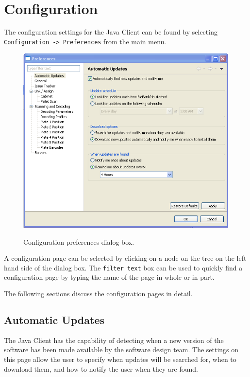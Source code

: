 \chapter{Configuration}
The configuration settings for the Java Client can be found by selecting
\texttt{Configuration -> Preferences} from the main menu.
    \begin{figure}[H]
      \centering
      \scalebox{0.5}
      { \includegraphics*{screenshots/configuration/preferences_dialog} }
      \caption{Configuration preferences dialog box.}
      \label{fig:preferences_dialog}
    \end{figure}
A configuration page can be selected by clicking on a node on the
tree on the left hand side of the dialog box. The \texttt{filter text} box can
be used to quickly find a configuration page by typing the name of the page in
whole or in part.

The following sections discuss the configuration pages in detail.

\section{Automatic Updates}
The Java Client has the capability of detecting when a new version of the
software has been made available by the software design team. The settings on
this page allow the user to specify when updates will be searched for, when to
download them, and how to notify the user when they are found.

